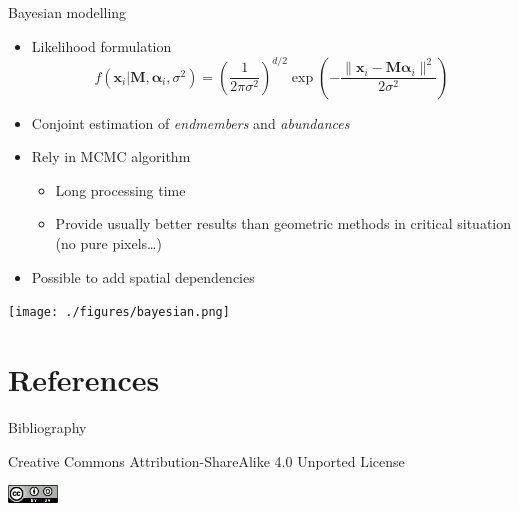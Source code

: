 \documentclass[10pt,aspectratio=1610]{beamer}
\begin{document}
\begin{frame}[label={sec:orgfccd888}]{Bayesian modelling}
\begin{itemize}
\item Likelihood formulation
$$f(\mathbf{x}_i|\mathbf{M},\boldsymbol{\alpha}_i,\sigma^2) = \left(\frac{1}{2\pi\sigma^2}\right)^{d/2}\exp\left(-\frac{\|\mathbf{x}_i-\mathbf{M}\boldsymbol{\alpha}_i\|^2}{2\sigma^2}\right)$$
\item Conjoint estimation of \emph{endmembers} and \emph{abundances} \cite{Dobigeon_IEEE_Trans_SP_2009}
\item Rely in MCMC algorithm
\begin{itemize}
\item Long processing time
\item Provide usually better results than geometric methods in critical situation (no pure pixels\ldots{})
\end{itemize}
\item Possible to add spatial dependencies \cite{Eches_IEEE_Trans_GRS_2011}
\end{itemize}

\begin{center}
\texttt{[image: ./figures/bayesian.png]}
\end{center}
\end{frame}
\section{References}
\label{sec:orgd4b1f00}
\begin{frame}[fragile,allowframebreaks,label=]{Bibliography}
\printbibliography
\end{frame}
\begin{frame}[label={sec:org37667df}]{}
\begin{center}
\tiny Creative Commons Attribution-ShareAlike 4.0 Unported License
\normalsize

\begin{center}
\includegraphics[width=0.1\textwidth]{figures/cc-by-sa.png}
\end{center}
\end{center}
\end{frame}
\end{document}
